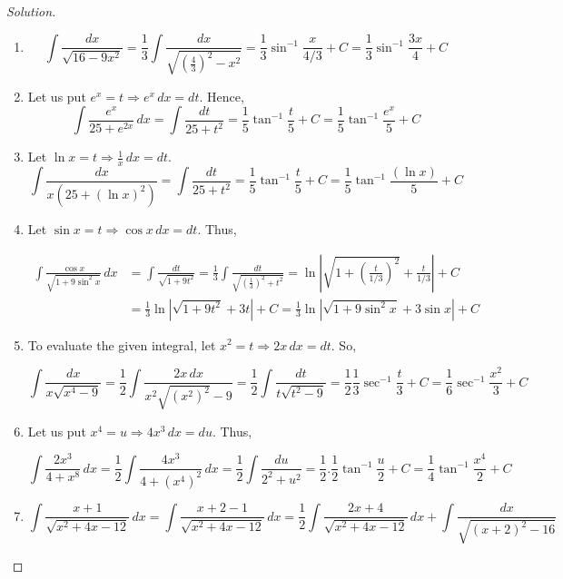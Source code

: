 \documentclass{book}
\theoremstyle{definition}
\newenvironment{solution}
    {\begin{proof}[Solution]}
    {\end{proof}}
\begin{document}
\begin{solution}
\begin{enumerate}[label=(\roman*)]
\item 
\[
\int \frac{dx}{\sqrt{16-9x^2}}=\frac{1}{3}\int \frac{dx}{\sqrt{(\frac{4}{3})^2-x^2}}=\frac{1}{3}\sin^{-1}\frac{x}{4/3}+C=\frac{1}{3}\sin^{-1}\frac{3x}{4}+C
\]

\item Let us put $e^x=t \Rightarrow e^x\,dx=dt$. Hence,
\[
\int \frac{e^x}{25+e^{2x}}\,dx=\int \frac{dt}{25+t^2}=\frac{1}{5}\tan^{-1}\frac{t}{5}+C=\frac{1}{5}\tan^{-1}\frac{e^x}{5}+C
\]


\item Let $\ln x=t \Rightarrow \frac{1}{x}\,dx=dt$.
\[
\int \frac{dx}{x(25+(\ln x)^2)}=\int \frac{dt}{25+t^2}=\frac{1}{5}\tan^{-1}\frac{t}{5}+C=\frac{1}{5}\tan^{-1}\frac{(\ln x)}{5}+C
\]


\item Let $\sin x=t \Rightarrow \cos x\,dx=dt$. Thus,

\begin{align*}
    \int \frac{\cos x}{\sqrt{1+9\sin^2 x}}\,dx &= \int \frac{dt}{\sqrt{1+9t^2}} = \frac{1}{3}\int\frac{dt}{\sqrt{(\frac{1}{3})^2+t^2}} = \ln\left|\sqrt{ 1+\left(\frac{t}{1/3}\right)^2}+\frac{t}{1/3}\right|+C \\
    &= \frac{1}{3}\ln|\sqrt{1+9t^2}+3t|+C = \frac{1}{3}\ln|\sqrt{1+9\sin^2x}+3\sin x|+C
\end{align*}


\item To evaluate the given integral, let $x^2=t \Rightarrow 2x\,dx=dt$. So,

\[
\int \frac{dx}{x\sqrt{x^4-9}} = \frac{1}{2}\int\frac{2x\,dx}{x^2\sqrt{(x^2)^2}-9} = \frac{1}{2}\int\frac{dt}{t\sqrt{t^2-9}} = \frac{1}{2}\frac{1}{3}\sec^{-1}\frac{t}{3}+C = \frac{1}{6}\sec^{-1}\frac{x^2}{3}+C
\]



\item Let us put $x^4=u \Rightarrow 4x^3\,dx=du$. Thus,

\[
\int \frac{2x^3}{4+x^8}\,dx = \frac{1}{2}\int \frac{4x^3}{4+(x^4)^2}\,dx = \frac{1}{2}\int \frac{du}{2^2+u^2}=\frac{1}{2}.\frac{1}{2}\tan^{-1}\frac{u}{2}+C=\frac{1}{4}\tan^{-1}\frac{x^4}{2}+C
\]

\item 
\[
\int \frac{x+1}{\sqrt{x^2+4x-12}}\,dx = \int \frac{x+2-1}{\sqrt{x^2+4x-12}}\,dx = \frac{1}{2}\int \frac{2x+4}{\sqrt{x^2+4x-12}}\,dx+\int \frac{dx}{\sqrt{(x+2)^2-16}}
\]


\end{enumerate}
\end{solution}
\end{document}
